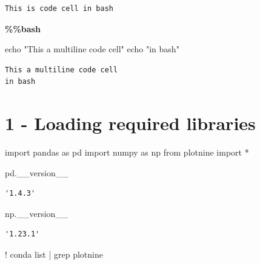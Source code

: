 \documentclass[
  letterpaper,
]{book}
\newenvironment{Shaded}{}{}
\newcommand{\BuiltInTok}[1]{\textcolor[rgb]{0.84,0.23,0.29}{#1}}
\newcommand{\ExtensionTok}[1]{\textcolor[rgb]{0.84,0.23,0.29}{\textbf{#1}}}
\newcommand{\ImportTok}[1]{\textcolor[rgb]{0.01,0.18,0.38}{#1}}
\newcommand{\NormalTok}[1]{\textcolor[rgb]{0.14,0.16,0.18}{#1}}
\newcommand{\OperatorTok}[1]{\textcolor[rgb]{0.14,0.16,0.18}{#1}}
\newcommand{\StringTok}[1]{\textcolor[rgb]{0.01,0.18,0.38}{#1}}
\begin{document}
\begin{verbatim}
This is code cell in bash
\end{verbatim}

\begin{Shaded}
\begin{Highlighting}[]
\ExtensionTok{\%\%bash}

\BuiltInTok{echo} \StringTok{"This a multiline code cell"}
\BuiltInTok{echo} \StringTok{"in bash"}
\end{Highlighting}
\end{Shaded}

\begin{verbatim}
This a multiline code cell
in bash
\end{verbatim}

\hypertarget{loading-required-libraries}{%
\section{1 - Loading required
libraries}\label{loading-required-libraries}}

\begin{Shaded}
\begin{Highlighting}[]
\ImportTok{import}\NormalTok{ pandas }\ImportTok{as}\NormalTok{ pd}
\ImportTok{import}\NormalTok{ numpy }\ImportTok{as}\NormalTok{ np}
\ImportTok{from}\NormalTok{ plotnine }\ImportTok{import} \OperatorTok{*}
\end{Highlighting}
\end{Shaded}

\begin{Shaded}
\begin{Highlighting}[]
\NormalTok{pd.\_\_version\_\_}
\end{Highlighting}
\end{Shaded}

\begin{verbatim}
'1.4.3'
\end{verbatim}

\begin{Shaded}
\begin{Highlighting}[]
\NormalTok{np.\_\_version\_\_}
\end{Highlighting}
\end{Shaded}

\begin{verbatim}
'1.23.1'
\end{verbatim}

\begin{Shaded}
\begin{Highlighting}[]
\OperatorTok{!}\NormalTok{ conda }\BuiltInTok{list} \OperatorTok{|}\NormalTok{ grep plotnine}
\end{Highlighting}
\end{Shaded}
\end{document}
